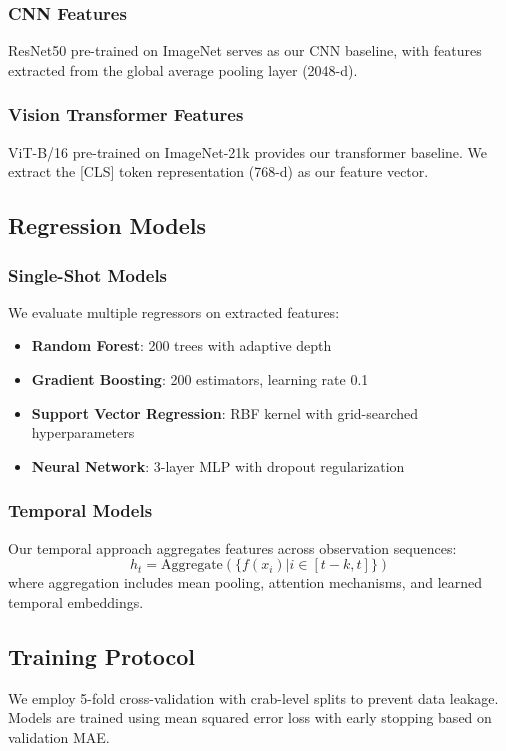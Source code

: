 \documentclass[10pt,twocolumn,letterpaper]{article}
\begin{document}
\subsubsection{CNN Features}
ResNet50 pre-trained on ImageNet serves as our CNN baseline, with features extracted from the global average pooling layer (2048-d).

\subsubsection{Vision Transformer Features}
ViT-B/16 pre-trained on ImageNet-21k provides our transformer baseline. We extract the [CLS] token representation (768-d) as our feature vector.

\subsection{Regression Models}

\subsubsection{Single-Shot Models}
We evaluate multiple regressors on extracted features:
\begin{itemize}
\item \textbf{Random Forest}: 200 trees with adaptive depth
\item \textbf{Gradient Boosting}: 200 estimators, learning rate 0.1
\item \textbf{Support Vector Regression}: RBF kernel with grid-searched hyperparameters
\item \textbf{Neural Network}: 3-layer MLP with dropout regularization
\end{itemize}

\subsubsection{Temporal Models}
Our temporal approach aggregates features across observation sequences:
\begin{equation}
h_t = \text{Aggregate}(\{f(x_i) | i \in [t-k, t]\})
\end{equation}
where aggregation includes mean pooling, attention mechanisms, and learned temporal embeddings.

\subsection{Training Protocol}
We employ 5-fold cross-validation with crab-level splits to prevent data leakage. Models are trained using mean squared error loss with early stopping based on validation MAE.
\end{document}
